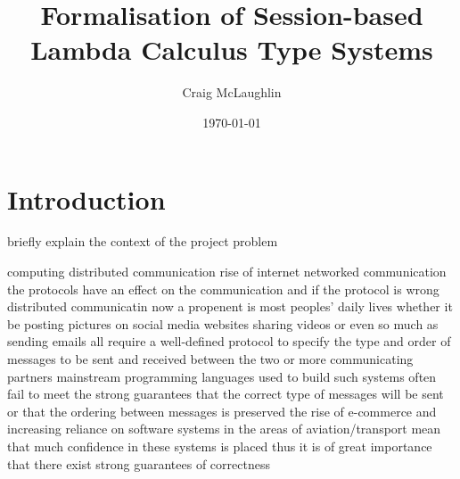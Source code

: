 \documentclass{mprop}
\begin{document}

\title{Formalisation of Session-based Lambda Calculus Type Systems}
\author{Craig McLaughlin}
\date{\today}
\maketitle


\tableofcontents
\newpage

\section{Introduction}\label{intro}

briefly explain the context of the project problem

computing distributed communication rise of internet networked communication
the protocols have an effect on the communication and if the protocol is wrong
distributed communicatin now a propenent is most peoples' daily lives
whether it be posting pictures on social media websites sharing videos
or even so much as sending emails all require a well-defined protocol to
specify the type and order of messages to be sent and received between the two
or more communicating partners
mainstream programming languages used to build such systems often fail to meet
the strong guarantees that the correct type of messages will be sent or that
the ordering between messages is preserved
the rise of e-commerce and increasing reliance on software systems in the
areas of aviation/transport mean that much confidence in these systems is placed thus it is of great importance that there exist strong guarantees of correctness
\end{document}
